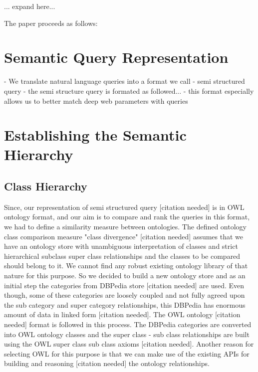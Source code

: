 \documentclass{www2010-submission}
\begin{document}
... expand here...

The paper proceeds as follows:

\section{Semantic Query Representation}
- We translate natural language queries into a format we call - semi structured query
- the semi structure query is formated as followed...
- this format especially allows us to better match deep web parameters with queries

\section{Establishing the Semantic Hierarchy}

\subsection{Class Hierarchy} 
Since, our representation of semi structured query [citation needed] is in OWL ontology format, and our aim is to compare and rank the queries in this format, we had to define a similarity measure between ontologies. The defined ontology class comparison measure "class divergence" [citation needed] assumes that we have an ontology store with unambiguous interpretation of classes and strict hierarchical subclass super class relationships and the classes to be compared should belong to it. We cannot find any robust existing ontology library of that nature for this purpose. So we decided to build a new ontology store and as an initial step the categories from DBPedia store [citation needed] are used. Even though, some of these categories are loosely coupled and not fully agreed upon the sub category and super category relationships, this DBPedia has enormous amount of data in linked form [citation needed]. The OWL ontology [citation needed] format is followed in this process. The DBPedia categories are converted into OWL ontology classes and the super class - sub class relationships are built using the OWL super class sub class axioms [citation needed]. Another reason for selecting OWL for this purpose is that we can make use of the existing APIs for building and reasoning [citation needed] the ontology relationships.    


\end{document}
